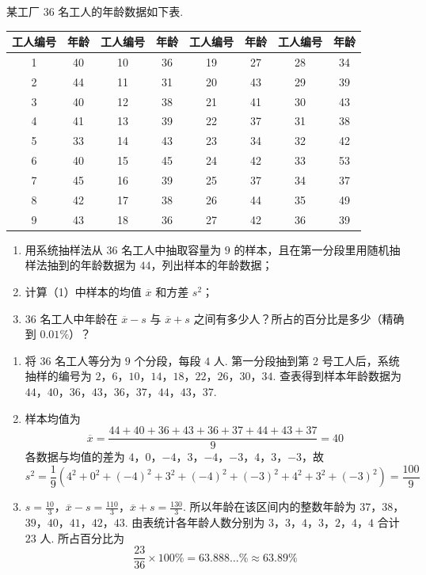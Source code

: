 \begin{problem}
某工厂 \(36\) 名工人的年龄数据如下表.

\begin{center}
\footnotesize
\renewcommand{\arraystretch}{1.15}
\begin{tabular}{|c|c|c|c|c|c|c|c|}
\hline
工人编号 & 年龄 & 工人编号 & 年龄 & 工人编号 & 年龄 & 工人编号 & 年龄 \\
\hline
1 & 40 & 10 & 36 & 19 & 27 & 28 & 34 \\
\hline
2 & 44 & 11 & 31 & 20 & 43 & 29 & 39 \\
\hline
3 & 40 & 12 & 38 & 21 & 41 & 30 & 43 \\
\hline
4 & 41 & 13 & 39 & 22 & 37 & 31 & 38 \\
\hline
5 & 33 & 14 & 43 & 23 & 34 & 32 & 42 \\
\hline
6 & 40 & 15 & 45 & 24 & 42 & 33 & 53 \\
\hline
7 & 45 & 16 & 39 & 25 & 37 & 34 & 37 \\
\hline
8 & 42 & 17 & 38 & 26 & 44 & 35 & 49 \\
\hline
9 & 43 & 18 & 36 & 27 & 42 & 36 & 39 \\
\hline
\end{tabular}
\end{center}

\begin{enumerate}
\item 用系统抽样法从 \(36\) 名工人中抽取容量为 \(9\) 的样本，且在第一分段里用随机抽样法抽到的年龄数据为 \(44\)，列出样本的年龄数据；
\item 计算（1）中样本的均值 \(\overline{x}\) 和方差 \(s^2\)；
\item \(36\) 名工人中年龄在 \(\overline{x} - s\) 与 \(\overline{x} + s\) 之间有多少人？所占的百分比是多少（精确到 \(0.01\%\)）？
\end{enumerate}
\end{problem}

\begin{solution}
\begin{enumerate}
\item 将 \(36\) 名工人等分为 \(9\) 个分段，每段 \(4\) 人. 第一分段抽到第 \(2\) 号工人后，系统抽样的编号为
\(2\)，\(6\)，\(10\)，\(14\)，\(18\)，\(22\)，\(26\)，\(30\)，\(34\).
查表得到样本年龄数据为
\(44\)，\(40\)，\(36\)，\(43\)，\(36\)，\(37\)，\(44\)，\(43\)，\(37\).
\item 样本均值为
\[
\overline{x}=\frac{44+40+36+43+36+37+44+43+37}{9}=40
\]
各数据与均值的差为 \(4\)，\(0\)，\(-4\)，\(3\)，\(-4\)，\(-3\)，\(4\)，\(3\)，\(-3\)，故
\[
s^2=\frac19\left(4^2+0^2+(-4)^2+3^2+(-4)^2+(-3)^2
+4^2+3^2+(-3)^2\right)=\frac{100}{9}
\]
\item
\(s=\frac{10}{3}\)，\(\overline{x}-s=\frac{110}{3}\)，\(\overline{x}+s=\frac{130}{3}\).
所以年龄在该区间内的整数年龄为 \(37\)，\(38\)，\(39\)，\(40\)，\(41\)，\(42\)，\(43\). 由表统计各年龄人数分别为
\(3\)，\(3\)，\(4\)，\(3\)，\(2\)，\(4\)，\(4\)
合计 \(23\) 人. 所占百分比为
\[
\frac{23}{36}\times100\%=63.888\ldots\%\approx63.89\%
\]
\end{enumerate}
\end{solution}

